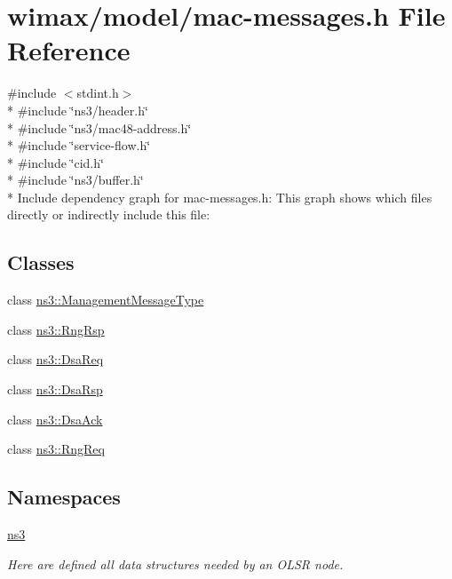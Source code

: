 \hypertarget{mac-messages_8h}{}\section{wimax/model/mac-\/messages.h File Reference}
\label{mac-messages_8h}
{\ttfamily \#include $<$stdint.\+h$>$}\\*
{\ttfamily \#include \char`\"{}ns3/header.\+h\char`\"{}}\\*
{\ttfamily \#include \char`\"{}ns3/mac48-\/address.\+h\char`\"{}}\\*
{\ttfamily \#include \char`\"{}service-\/flow.\+h\char`\"{}}\\*
{\ttfamily \#include \char`\"{}cid.\+h\char`\"{}}\\*
{\ttfamily \#include \char`\"{}ns3/buffer.\+h\char`\"{}}\\*
Include dependency graph for mac-\/messages.h\+:
This graph shows which files directly or indirectly include this file\+:
\subsection*{Classes}
\begin{DoxyCompactItemize}
\item 
class \hyperlink{classns3_1_1ManagementMessageType}{ns3\+::\+Management\+Message\+Type}
\item 
class \hyperlink{classns3_1_1RngRsp}{ns3\+::\+Rng\+Rsp}
\item 
class \hyperlink{classns3_1_1DsaReq}{ns3\+::\+Dsa\+Req}
\item 
class \hyperlink{classns3_1_1DsaRsp}{ns3\+::\+Dsa\+Rsp}
\item 
class \hyperlink{classns3_1_1DsaAck}{ns3\+::\+Dsa\+Ack}
\item 
class \hyperlink{classns3_1_1RngReq}{ns3\+::\+Rng\+Req}
\end{DoxyCompactItemize}
\subsection*{Namespaces}
\begin{DoxyCompactItemize}
\item 
 \hyperlink{namespacens3}{ns3}
\begin{DoxyCompactList}\small\item\em Here are defined all data structures needed by an O\+L\+SR node. \end{DoxyCompactList}\end{DoxyCompactItemize}
